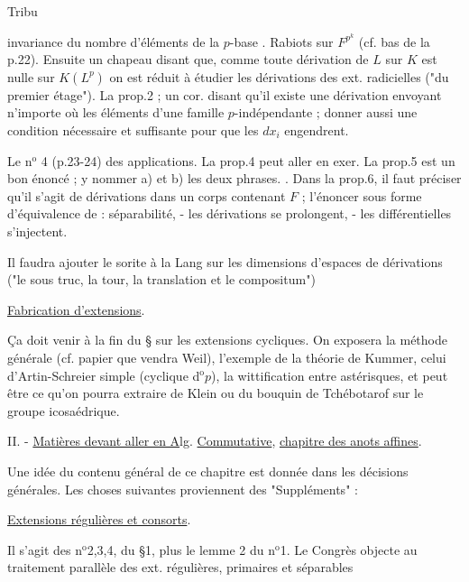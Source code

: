 
Tribu 

invariance du nombre d'éléments de la $p$-base . Rabiots sur $F^{p^k}$ (cf. bas de la p.22). Ensuite un chapeau disant que, comme toute dérivation de $L$ sur $K$ est nulle sur $K(L^p)$ on est réduit à étudier les dérivations des ext. radicielles ("du premier étage"). La prop.2 ; un cor. disant qu'il existe une dérivation envoyant n'importe où les éléments d'une famille $p$-indépendante ; donner aussi une condition nécessaire et suffisante pour que les $dx_i$ engendrent.

Le n$^{\mathrm{o}}$ 4 (p.23-24) des applications. La prop.4 peut aller en exer. La prop.5 est un bon énoncé ; y nommer a) et b) les deux phrases. . Dans la prop.6, il faut préciser qu'il s'agit de dérivations dans un corps contenant $F$ ; l'énoncer sous forme d'équivalence de : séparabilité, - les dérivations se prolongent, - les différentielles s'injectent.

Il faudra ajouter le sorite à la Lang sur les dimensions d'espaces de dérivations ("le sous truc, la tour, la translation et le compositum")

\uline{Fabrication d'extensions}.

Ça doit venir à la fin du \S{} sur les extensions cycliques. On exposera la méthode générale (cf. papier que vendra \quad Weil), l'exemple de la théorie de Kummer, celui d'Artin-Schreier simple (cyclique d$^{\mathrm{o}}p$), la wittification entre astérisques, et peut être ce qu'on pourra extraire de Klein ou du bouquin de Tchébotarof sur le groupe icosaédrique.

II. - \uline{Matières devant aller en A}lg. \uline{Commutative}, \uline{chapitre des anots affines}.

Une idée du contenu général de ce chapitre est donnée dans les décisions générales. Les choses suivantes proviennent des "Suppléments" :

\uline{Extensions régulières et consorts}.

Il s'agit des n$^{\mathrm{o}}$2,3,4, du \S{}1, plus le lemme 2 du n$^{\mathrm{o}}$1. Le Congrès objecte au traitement parallèle des ext. régulières, primaires et séparables


